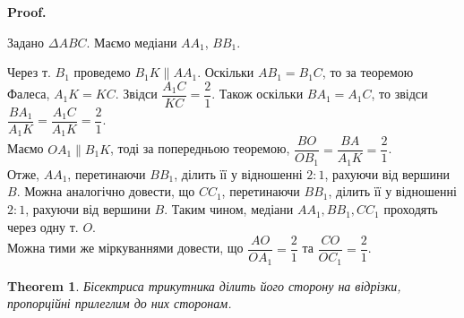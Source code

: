 \documentclass[a4paper, 10pt]{article}
\makeatletter
\def\qed{$\blacksquare$}
\theoremstyle{theoremdd}
\newtheorem{theorem}{Theorem}[subsection]
\theoremstyle{theoremdd}
\theoremstyle{theoremdd}
\theoremstyle{theoremdd}
\theoremstyle{theoremdd}
\theoremstyle{theoremdd}
\theoremstyle{theoremdd}
\theoremstyle{theoremdd}
\theoremstyle{theoremdd}
\renewenvironment{proof}[1][Proof.\\]{\par
\pushQED{\hfill \qed}%
\normalfont \topsep6\p@\@plus6\p@\relax
\trivlist
\item\relax
{\bfseries
#1\@addpunct{.}}\hspace\labelsep\ignorespaces
}{%
\popQED\endtrivlist\@endpefalse
}
\makeatother
\begin{document}
\begin{proof}
Задано $\Delta ABC$. Маємо медіани $AA_1$, $BB_1$.
\begin{figure}[H]
\centering
{}
\end{figure}
Через т. $B_1$ проведемо $B_1K \parallel AA_1$. Оскільки $AB_1 = B_1C$, то за теоремою Фалеса, $A_1K = KC$. Звідси $\dfrac{A_1C}{KC} = \dfrac{2}{1}$. Також оскільки $BA_1 = A_1C$, то звідси $\dfrac{BA_1}{A_1K} = \dfrac{A_1C}{A_1K} = \dfrac{2}{1}$.\\
Маємо $OA_1 \parallel B_1K$, тоді за попередньою теоремою, $\dfrac{BO}{OB_1} = \dfrac{BA}{A_1K} = \dfrac{2}{1}$.\\
Отже, $AA_1$, перетинаючи $BB_1$, ділить її у відношенні $2 : 1$, рахуючи від вершини $B$. Можна аналогічно довести, що $CC_1$, перетинаючи $BB_1$, ділить її у відношенні $2 : 1$, рахуючи від вершини $B$. Таким чином, медіани $AA_1,BB_1,CC_1$ проходять через одну т. $O$.
\bigskip \\
Можна тими же міркуваннями довести, що $\dfrac{AO}{OA_1} = \dfrac{2}{1}$ та $\dfrac{CO}{OC_1} = \dfrac{2}{1}$.
\end{proof}

\begin{theorem}
Бісектриса трикутника ділить його сторону на відрізки, пропорційні прилеглим до них сторонам.
\end{theorem}
\end{document}
